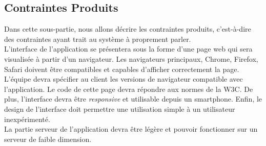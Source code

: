 \newpage
\subsection{Contraintes Produits}
Dans cette sous-partie, nous allons décrire les contraintes produits, c'est-à-dire des contraintes ayant trait au système à proprement parler.\\

L'interface de l'application se présentera sous la forme d'une page web qui sera visualisée à partir d'un navigateur. Les navigateurs principaux, Chrome, Firefox, Safari doivent être compatibles et capables d'afficher correctement la page. L'équipe \PIC{} devra spécifier au client les versions de navigateur compatible avec l'application.  Le code de cette page devra répondre aux normes de la W3C. De plus, l'interface devra être \emph{responsive} et utilisable depuis un smartphone. Enfin, le design de l'interface doit permettre une utilisation simple à un utilisateur inexpérimenté.\\

La partie serveur de l'application devra être légère et pouvoir fonctionner sur un serveur de faible dimension.\\
